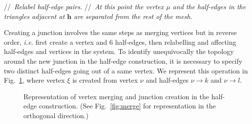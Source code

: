 \documentclass[aps, superscriptaddress, notitlepage]{revtex4-1}
\providecommand{\LINECOMMENT}[1]{\STATEx//~{\em#1}}
\def\scale{0.8}
\begin{document}
\begin{algorithm}[H]
\begin{algorithmic}[1]
 
\LINECOMMENT{Relabel half-edge pairs.}
 
 
 
 
 
\LINECOMMENT{At this point the vertex $\mu$ and the half-edges in the triangles adjacent at $\boldsymbol{h}$ are separated from the rest of the mesh.}
\end{algorithmic}
\end{algorithm}

Creating a junction involves the same steps as merging vertices but in reverse order, \textit{i.e.} first create a vertex and 6 half-edges, then relabelling and affecting half-edges and vertices in the system. To identify unequivocally the topology around the new junction in the half-edge construction, it is necessary to specify two distinct half-edges going out of a same vertex. We represent this operation in Fig.~\ref{fig:create}, where vertex $\xi$ is created from vertex $\nu$ and half-edges {\color{green}$\nu \to k$} and {\color{yellow}$\nu \to l$}.

\begin{figure}[!t]
\centering
\begin{tikzpicture}[scale=0.75*\scale]

\end{tikzpicture}
\caption{Representation of vertex merging and junction creation in the half-edge construction. (See Fig.~\ref{fig:merge} for representation in the orthogonal direction.)}
\label{fig:create}
\end{figure}
\end{document}
